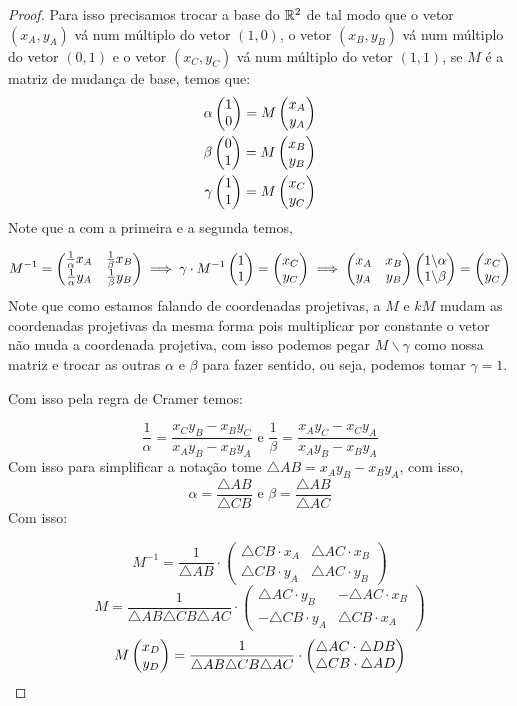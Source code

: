 \begin{proof}
  Para isso precisamos trocar a base do $\mathbb{R}^2$ de tal modo que o vetor $(x_A,y_A)$ vá num múltiplo do vetor $(1,0)$, o vetor $(x_B,y_B)$ vá num múltiplo do vetor $(0,1)$ e o vetor $(x_C,y_C)$ vá num múltiplo do vetor $(1,1)$, se $M$ é a matriz de mudança de base, temos que:
    \begin{align*}
        \alpha \begin{pmatrix} 1 \\ 0 \\  \end{pmatrix}  = M \begin{pmatrix} x_A \\ y_A \\  \end{pmatrix} \\
        \beta \begin{pmatrix} 0 \\ 1 \\  \end{pmatrix} = M \begin{pmatrix} x_B \\ y_B \\  \end{pmatrix} \\
        \gamma \begin{pmatrix} 1 \\ 1 \\  \end{pmatrix} = M \begin{pmatrix} x_C \\ y_C \\  \end{pmatrix}
    \end{align*} 
Note que a com a primeira e a segunda temos,

\[ M^{-1} = \begin{pmatrix}
    \frac{1}{\alpha} x_A& \frac{1}{\beta} x_B\\
    \frac{1}{\alpha} y_A& \frac{1}{\beta} y_B
    \end{pmatrix}
    \implies 
    \gamma \cdot M^{-1} \begin{pmatrix} 1 \\ 1 \\  \end{pmatrix} = \begin{pmatrix} x_C \\ y_C \\  \end{pmatrix} \implies 
    \begin{pmatrix}
        x_A& x_B \\
        y_A& y_B
    \end{pmatrix}
    \begin{pmatrix} 1\backslash \alpha \\ 1\backslash \beta \\  \end{pmatrix}
    = \begin{pmatrix} x_C \\ y_C \\  \end{pmatrix}
\]
Note que como estamos falando de coordenadas projetivas, a $M$ e $kM$ mudam as coordenadas projetivas da mesma forma pois multiplicar por constante o vetor não muda a coordenada projetiva, com isso podemos pegar $M\backslash \gamma$ como nossa matriz e trocar as outras $\alpha$ e $\beta$ para fazer sentido, ou seja, podemos tomar $\gamma = 1$.

Com isso pela regra de Cramer temos:

\[\frac{1}{\alpha} = \frac{x_Cy_B-x_By_C}{x_Ay_B-x_By_A} \text{ e } \frac{1}{\beta} = \frac{x_Ay_C-x_Cy_A}{x_Ay_B-x_By_A}\] 
Com isso para simplificar a notação tome $\triangle AB = x_Ay_B-x_By_A$, com isso,
\[ \alpha = \frac{\triangle AB}{\triangle CB} \text{ e } \beta = \frac{\triangle AB}{\triangle AC}\]
Com isso:

\[ M^{-1} = \frac{1}{\triangle AB} \cdot \begin{pmatrix}
    \triangle CB \cdot x_A& \triangle AC \cdot x_B \\
    \triangle CB \cdot y_A& \triangle AC \cdot y_B
\end{pmatrix}\]
\[M =  \frac{1}{\triangle AB\triangle CB \triangle AC} \cdot \begin{pmatrix}
    \triangle AC \cdot y_B & -\triangle AC \cdot x_B \\
    -\triangle CB \cdot y_A & \triangle CB \cdot x_A
\end{pmatrix}  
    \]
\[ M \begin{pmatrix} x_D \\ y_D \\  \end{pmatrix} =  \frac{1}{\triangle AB\triangle CB \triangle AC} \cdot \begin{pmatrix} \triangle AC \cdot \triangle DB \\ \triangle CB \cdot \triangle AD \\  \end{pmatrix}\]


\end{proof}
